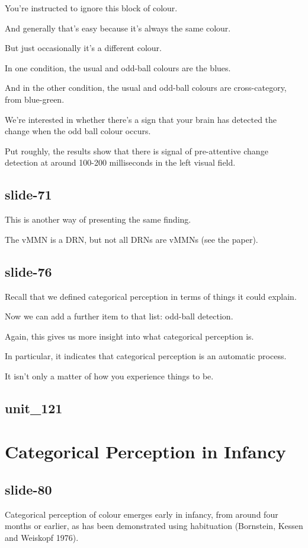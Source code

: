 \documentclass[12pt,\papersize]{extarticle}
\begin{document}
You're instructed to ignore this block of colour.
 
And generally that's easy because it's always the same colour.
 
But just occasionally it's a different colour.
 
In one condition, the usual and odd-ball colours are the blues.
 
And in the other condition, the usual and odd-ball colours are cross-category, from blue-green.
 
We're interested in whether there's a sign that your brain has detected the change when the odd ball colour occurs.
 
Put roughly, the results show that there is signal of pre-attentive change detection at around 100-200 milliseconds in the left visual field.
 
\subsection{slide-71}
This is another way of presenting the same finding.
 
The vMMN is a DRN, but not all DRNs are vMMNs (see the paper).
 
\subsection{slide-76}
Recall that we defined categorical perception in terms of things it could explain.
 
Now we can add a further item to that list: odd-ball detection.
 
Again, this gives us more insight into what categorical perception is.
 
In particular, it indicates that categorical perception is an automatic process.
 
It isn't only a matter of how you experience things to be.
 
\subsection{unit\_121}
 
 
\section{Categorical Perception in Infancy}
 
\subsection{slide-80}
Categorical perception of colour emerges early in infancy, from around four months or earlier, as has been demonstrated using habituation (Bornstein, Kessen and Weiskopf 1976).
 
\end{document}
